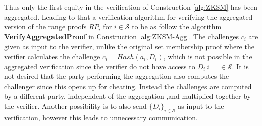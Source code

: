 Thus  only the first equity  in the verification of Construction \ref{alg:ZKSM} has been aggregated. Leading to that a verification algorithm for verifying the  aggregated version of the range proofs $RP_i$ for $i\in\mathcal{S}$  to be as follow the algorithm \textbf{VerifyAggregatedProof} in Construction \ref{alg:ZKSM-Agg}.  %
 The challenges $c_i$ are given as input to the verifier, unlike the original set membership proof where the verifier calculates the challenge $c_i=Hash(a_i,D_i)$, which is not possible in the aggregated verification since the verifier do not have access to $D_i\: i=\in\mathcal{S}$. It is not desired that the party performing the aggregation also computes the challenger since this opens up for cheating. Instead the challenges are computed by a different party, independent of the aggregation ,and multiplied together by the verifier. Another possibility is to also send $\{D_i\}_{i\in\mathcal{S}}$ as input to the verification, however this leads to unnecessary communication.
 
